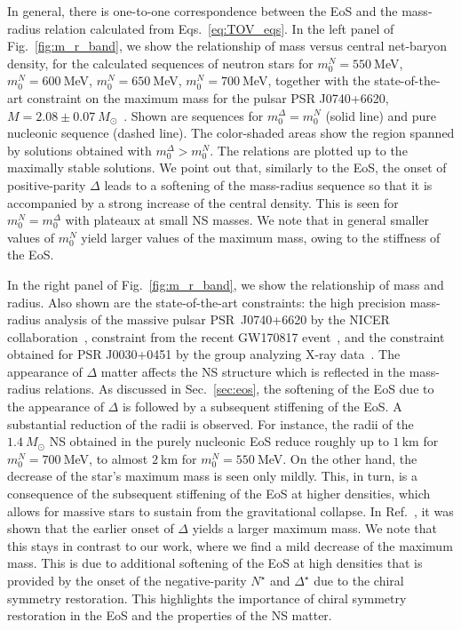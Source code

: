 \documentclass[preprint,showkeys,lengthcheck,nofootinbib,twocolumn,notitlepage,floatfix,superscriptaddress]{revtex4-1}
\begin{document}
In general, there is one-to-one correspondence between the EoS and the \mbox{mass-radius} relation calculated from Eqs.~\eqref{eq:TOV_eqs}. In the left panel of Fig.~\ref{fig:m_r_band}, we show the relationship of mass versus central net-baryon density, for the calculated sequences of neutron stars for $m_0^N=550~$MeV, $m_0^N=600~$MeV, $m_0^N=650~$MeV, $m_0^N=700~$MeV, together with the state-of-the-art constraint on the maximum mass for the pulsar PSR J0740+6620, $M=2.08\pm0.07~M_\odot$~\cite{Fonseca:2021wxt}. Shown are sequences for $m_0^\Delta=m_0^N$ (solid line) and pure nucleonic sequence (dashed line). The color-shaded areas show the region spanned by solutions obtained with $m_0^\Delta > m_0^N$. The relations are plotted up to the maximally stable solutions. We point out that, similarly to the EoS, the onset of positive-parity $\Delta$ leads to a softening of the mass-radius sequence so that it is accompanied by a strong increase of the central density. This is seen for $m_0^N = m_0^\Delta$ with plateaux at small NS masses. We note that in general smaller values of $m_0^N$ yield larger values of the maximum mass, owing to the stiffness of the EoS. 

In the right panel of Fig.~\ref{fig:m_r_band}, we show the relationship of mass and radius. Also shown are the state-of-the-art constraints: the high precision mass-radius analysis of the massive pulsar PSR~J0740+6620 by the NICER collaboration~\cite{Riley:2021pdl, Miller:2021qha}, constraint from the recent GW170817 event~\cite{Abbott:2018exr}, and the constraint obtained for PSR J0030+0451 by the group analyzing X-ray data~\cite{Miller:2019cac}. The appearance of $\Delta$ matter affects the NS structure which is reflected in the mass-radius relations. As discussed in Sec.~\ref{sec:eos}, the softening of the EoS due to the appearance of $\Delta$ is followed by a subsequent stiffening of the EoS. A substantial reduction of the radii is observed. For instance, the radii of the $1.4~M_\odot$ NS obtained in the purely nucleonic EoS reduce roughly up to $1~$km for $m_0^N=700~$MeV, to almost $2~$km for $m_0^N=550~$MeV. On the other hand, the decrease of the star's maximum mass is seen only mildly. This, in turn, is a consequence of the subsequent stiffening of the EoS at higher densities, which allows for massive stars to sustain from the gravitational collapse. In Ref.~\cite{Li:2018qaw}, it was shown that the earlier onset of $\Delta$ yields a larger maximum mass. We note that this stays in contrast to our work, where we find a mild decrease of the maximum mass. This is due to additional softening of the EoS at high densities that is provided by the onset of the negative-parity $N^\star$ and $\Delta^\star$ due to the chiral symmetry restoration. This highlights the importance of chiral symmetry restoration in the EoS and the properties of the NS matter.
\end{document}
